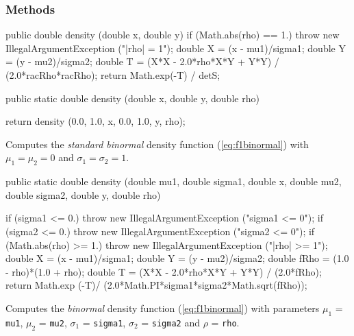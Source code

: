 \subsubsection* {Methods}
\begin{code}\begin{hide}

   public double density (double x, double y) {
      if (Math.abs(rho) == 1.)
         throw new IllegalArgumentException ("|rho| = 1");
      double X = (x - mu1)/sigma1;
      double Y = (y - mu2)/sigma2;
      double T = (X*X - 2.0*rho*X*Y + Y*Y) / (2.0*racRho*racRho);
      return Math.exp(-T) / detS;
   }\end{hide}

   public static double density (double x, double y, double rho) \begin{hide} {
       return density (0.0, 1.0, x, 0.0, 1.0, y, rho);
   }\end{hide}
\end{code}
\begin{tabb} Computes the {\em standard binormal\/} density function
 (\ref{eq:f1binormal}) with $\mu_1 = \mu_2 = 0$ and $\sigma_1 = \sigma_2 = 1$.
\end{tabb}
\begin{code}

   public static double density (double mu1, double sigma1, double x, 
                                 double mu2, double sigma2, double y,
                                 double rho) \begin{hide} {
      if (sigma1 <= 0.)
         throw new IllegalArgumentException ("sigma1 <= 0");
      if (sigma2 <= 0.)
         throw new IllegalArgumentException ("sigma2 <= 0");
      if (Math.abs(rho) >= 1.)
         throw new IllegalArgumentException ("|rho| >= 1");
      double X = (x - mu1)/sigma1;
      double Y = (y - mu2)/sigma2;
      double fRho = (1.0 - rho)*(1.0 + rho);
      double T = (X*X - 2.0*rho*X*Y + Y*Y) / (2.0*fRho);
      return Math.exp (-T)/ (2.0*Math.PI*sigma1*sigma2*Math.sqrt(fRho));

   }\end{hide}
\end{code}
\begin{tabb} Computes the {\em binormal\/} density function (\ref{eq:f1binormal})
  with parameters $\mu_1$ = \texttt{mu1}, $\mu_2$ = \texttt{mu2}, $\sigma_1$ =
   \texttt{sigma1},  $\sigma_2$ = \texttt{sigma2} and $\rho$ = \texttt{rho}.
\end{tabb}
